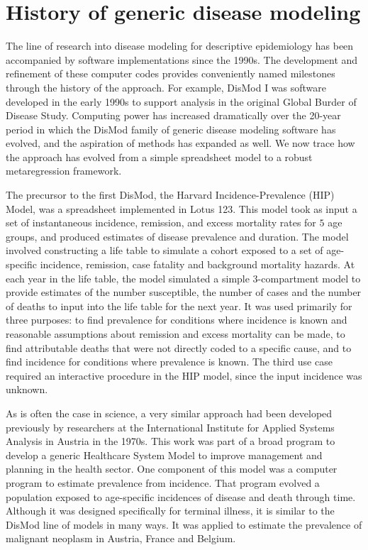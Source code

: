 \section{History of generic disease modeling}

The line of research into disease modeling for descriptive
epidemiology has been accompanied by software implementations since
the 1990s.  The development and refinement of these computer codes
provides conveniently named milestones through the history of the
approach.  For example, DisMod I was software developed in the early
1990s to support analysis in the original Global Burder of Disease
Study.  Computing power has increased dramatically over the 20-year
period in which the DisMod family of generic disease modeling software
has evolved, and the aspiration of methods has expanded as well. We
now trace how the approach has evolved from a simple spreadsheet model
to a robust metaregression framework.

The precursor to the first DisMod, the Harvard Incidence-Prevalence
(HIP) Model, was a spreadsheet implemented in Lotus 123.
\cite{Murray_Quantifying_1994} This model took as input a set of
instantaneous incidence, remission, and excess mortality rates for $5$
age groups, and produced estimates of disease prevalence and duration.
The model involved constructing a life table to simulate a cohort
exposed to a set of age-specific incidence, remission, case fatality
and background mortality hazards. At each year in the life table, the
model simulated a simple 3-compartment model to provide estimates of
the number susceptible, the number of cases and the number of deaths
to input into the life table for the next year.  It was used primarily
for three purposes: to find prevalence for conditions where incidence
is known and reasonable assumptions about remission and excess
mortality can be made, to find attributable deaths that were not
directly coded to a specific cause, and to find incidence for
conditions where prevalence is known.  The third use case required an
interactive procedure in the HIP model, since the input incidence was
unknown.

As is often the case in science, a very similar approach had been
developed previously by researchers at the International Institute
for Applied Systems Analysis in Austria in the 1970s. This work was
part of a broad program to develop a generic Healthcare System Model
to improve management and planning in the health sector. One component
of this model was a computer program to estimate prevalence from
incidence.\cite{Klementiev_On_1977} That program evolved a population
exposed to age-specific incidences of disease and death through time.
Although it was designed specifically for terminal illness, it is
similar to the DisMod line of models in many ways. It was applied to
estimate the prevalence of malignant neoplasm in Austria, France and
Belgium.



